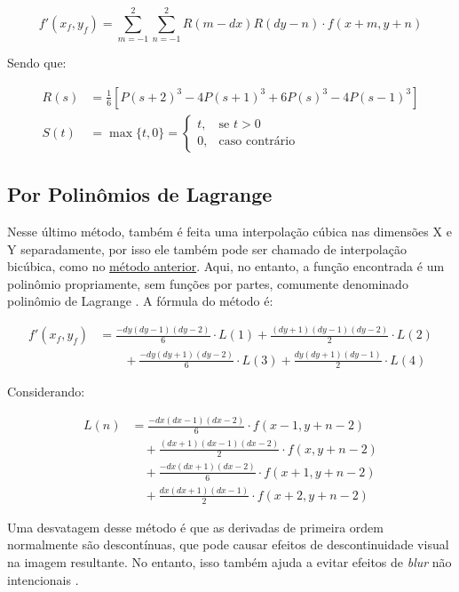 \[
    f'(x_f, y_f) = \sum_{m = -1}^2 \sum_{n = -1}^2 R(m - dx) R(dy - n) \cdot f(x + m, y + n)
\]

Sendo que:

\begin{align*}
    R(s) &= \frac{1}{6} \left[P(s + 2)^3 - 4 P(s+1)^3 + 6 P(s)^3 - 4 P(s-1)^3\right] \\
    S(t) &= \max\{t, 0\} = \begin{cases}
        t, & \text{se } t > 0 \\
        0, & \text{caso contrário}
    \end{cases}
\end{align*}

\subsection{Por Polinômios de Lagrange} \label{sec:interp:lagrange}

Nesse último método, também é feita uma interpolação cúbica nas dimensões X e Y separadamente, por isso ele também pode ser chamado de interpolação bicúbica, como no \hyperref[sec:interp:bicubica]{método anterior}. Aqui, no entanto, a função encontrada é um polinômio propriamente, sem funções por partes, comumente denominado polinômio de Lagrange \autocite{lagrange}. A fórmula do método é:

\begin{align*}
    f'(x_f, y_f) &= \frac{-dy (dy - 1) (dy - 2)}{6} \cdot L(1) + \frac{(dy + 1) (dy - 1) (dy - 2)}{2} \cdot L(2) \\
    &\qquad + \frac{-dy (dy + 1) (dy - 2)}{6} \cdot L(3) + \frac{dy (dy + 1) (dy - 1)}{2} \cdot L(4)
\end{align*}

Considerando:

\begin{align*}
    L(n) &= \frac{-dx (dx - 1) (dx - 2)}{6} \cdot f(x - 1, y + n - 2) \\
    &\quad + \frac{(dx + 1) (dx - 1) (dx - 2)}{2} \cdot f(x, y + n - 2) \\
    &\quad + \frac{-dx (dx + 1) (dx - 2)}{6} \cdot f(x + 1, y + n - 2) \\
    &\quad + \frac{dx (dx + 1) (dx - 1)}{2} \cdot f(x + 2, y + n - 2)
\end{align*}

Uma desvatagem desse método é que as derivadas de primeira ordem normalmente são descontínuas, que pode causar efeitos de descontinuidade visual na imagem resultante. No entanto, isso também ajuda a evitar efeitos de \textit{blur} não intencionais \autocite{upsample}.
